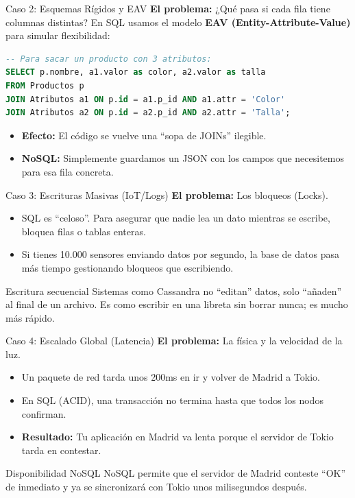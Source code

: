 \begin{frame}[fragile]{Caso 2: Esquemas Rígidos y EAV}
  \textbf{El problema:} ¿Qué pasa si cada fila tiene columnas distintas?
  En SQL usamos el modelo \textbf{EAV (Entity-Attribute-Value)} para simular flexibilidad:
  \begin{lstlisting}[language=SQL]
-- Para sacar un producto con 3 atributos:
SELECT p.nombre, a1.valor as color, a2.valor as talla
FROM Productos p
JOIN Atributos a1 ON p.id = a1.p_id AND a1.attr = 'Color'
JOIN Atributos a2 ON p.id = a2.p_id AND a2.attr = 'Talla';
  \end{lstlisting}
  \begin{itemize}
    \item \textbf{Efecto:} El código se vuelve una ``sopa de JOINs'' ilegible.
    \item \textbf{NoSQL:} Simplemente guardamos un JSON con los campos que necesitemos para esa fila concreta.
  \end{itemize}
\end{frame}

\begin{frame}{Caso 3: Escrituras Masivas (IoT/Logs)}
  \textbf{El problema:} Los bloqueos (Locks).
  \begin{itemize}
    \item SQL es ``celoso''. Para asegurar que nadie lea un dato mientras se escribe, bloquea filas o tablas enteras.
    \item Si tienes 10.000 sensores enviando datos por segundo, la base de datos pasa más tiempo gestionando bloqueos que escribiendo.
  \end{itemize}
  \begin{exampleblock}{Escritura secuencial}
    Sistemas como Cassandra no ``editan'' datos, solo ``añaden'' al final de un archivo. Es como escribir en una libreta sin borrar nunca; es mucho más rápido.
  \end{exampleblock}
\end{frame}

\begin{frame}{Caso 4: Escalado Global (Latencia)}
  \textbf{El problema:} La física y la velocidad de la luz.
  \begin{itemize}
    \item Un paquete de red tarda unos 200ms en ir y volver de Madrid a Tokio.
    \item En SQL (ACID), una transacción no termina hasta que todos los nodos confirman.
    \item \textbf{Resultado:} Tu aplicación en Madrid va lenta porque el servidor de Tokio tarda en contestar.
  \end{itemize}
  \begin{alertblock}{Disponibilidad NoSQL}
    NoSQL permite que el servidor de Madrid conteste ``OK'' de inmediato y ya se sincronizará con Tokio unos milisegundos después.
  \end{alertblock}
\end{frame}
